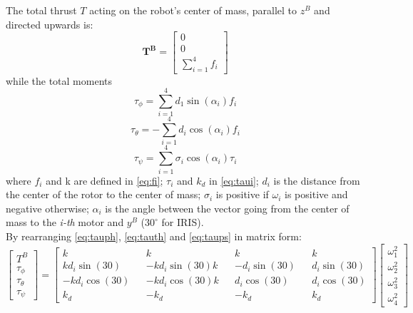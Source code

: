 \noindent
The total thrust $T$ acting on the robot's center of mass, parallel to $z^B$ and directed upwards is:
\begin{equation}
\boldsymbol{T^B}=\begin{bmatrix}0\\0\\\sum_{i=1}^{4}f_i
\end{bmatrix}
\label{eq:T}
\end{equation}
while the total moments
\begin{equation}
\tau_\phi = \sum_{i=1}^{4}d_1\sin(\alpha_i) f_i
\label{eq:tauph}
\end{equation}
\begin{equation}
\tau_\theta = -\sum_{i=1}^{4}d_i\cos(\alpha_i) f_i
\label{eq:tauth}
\end{equation}
\begin{equation}
\tau_\psi = \sum_{i=1}^{4}\sigma_i\cos(\alpha_i) \tau_i
\label{eq:taups}
\end{equation}
where $f_i$ and k are defined in \ref{eq:fi}; $\tau_i$ and $k_d$ in \ref{eq:taui}; $d_i$ is the distance from the center of the rotor to the center of mass; $\sigma_i$ is positive if $\omega_i$ is positive and negative otherwise; $\alpha_i$ is the angle between the vector going from the center of mass to the \textit{i-th} motor and $y^B$ ($30^\circ$ for IRIS).\\
\noindent
By rearranging \ref{eq:tauph}, \ref{eq:tauth} and \ref{eq:taups} in matrix form:
\begin{equation}
\begin{bmatrix}
T^B\\\tau_\phi\\\tau_\theta\\\tau_\psi
\end{bmatrix} = \begin{bmatrix}
k&&k&&k&&k\\
k d_i \sin(30)&&-k d_i \sin(30)k&& -d_i \sin(30)&&d_i \sin(30)\\
-k d_i \cos(30)&&-k d_i \cos(30)k&& d_i \cos(30)&&d_i \cos(30)\\
k_d&&-k_d&&-k_d&&k_d
\end{bmatrix} \begin{bmatrix}
\omega_1^2\\\omega_2^2\\\omega_3^2\\\omega_4^2
\end{bmatrix}
\label{eq:inputmix}
\end{equation}

